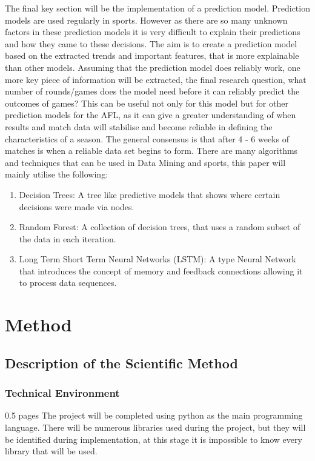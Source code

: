 \documentclass{imc-inf}
\begin{document}
	The final key section will be the implementation of a prediction model. Prediction models are used regularly in sports. However as there are so many unknown factors in these prediction models it is very difficult to explain their predictions and how they came to these decisions. The aim is to create a prediction model based on the extracted trends and important features, that is more explainable than other models. 
	Assuming that the prediction model does reliably work, one more key piece of information will be extracted, the final research question, what number of rounds/games does the model need before it can reliably predict the outcomes of games? This can be useful not only for this model but for other prediction models for the AFL, as it can give a greater understanding of when results and match data will stabilise and become reliable in defining the characteristics of a season. The general consensus is that after 4 - 6 weeks of matches is when a reliable data set begins to form.
	There are many algorithms and techniques that can be used in Data Mining and sports, this paper will mainly utilise the following:
	
	\begin{enumerate}
		\item[] Decision Trees: A tree like predictive models that shows where certain decisions were made via nodes.
		\item[] Random Forest: A collection of decision trees, that uses a random subset of the data in each iteration.
		\item[] Long Term Short Term Neural Networks (LSTM): A type Neural Network that introduces the concept of memory and feedback connections allowing it to process data sequences.
	\end{enumerate}
	

	
	\chapter{Method}\label{chap:method}
	\section{Description of the Scientific Method }
	
	\subsection{Technical Environment}
	0.5 pages
	The project will be completed using python as the main programming language. There will be numerous libraries used during the project, but they will be identified during implementation, at this stage it is impossible to know every library that will be used.
	
\end{document}
